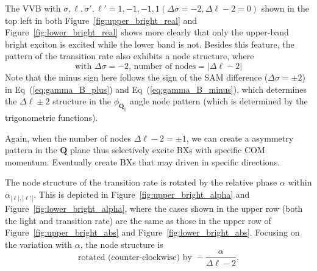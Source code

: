 \noindent
The VVB with $\sigma,\ell,\sigma',\ell'=1, -1, -1, 1(\Delta \sigma=-2, \Delta \ell-2=0)$  shown in the top left in both Figure~\ref{fig:upper_bright_real} and Figure~\ref{fig:lower_bright_real} shows more clearly that only the upper-band bright exciton is excited while the lower band is not. Besides this feature, the pattern of the transition rate also exhibits a node structure, where
\begin{equation*}
\text{with }\Delta \sigma =-2 \text{, number of nodes} = |\Delta \ell-2|
\end{equation*}
Note that the minus sign here follows the sign of the SAM difference ($\Delta \sigma=\pm 2$) in Eq~(\ref{eq:gamma_B_plus}) and Eq~(\ref{eq:gamma_B_minus}), which determines the $\Delta \ell\pm2$ structure in the $\phi_{\boldsymbol{Q}_{\|}}$ angle node pattern (which is determined by the trigonometric functions). 

\noindent
Again, when the number of nodes $\Delta \ell-2=\pm1$, we can create a asymmetry pattern in the $\boldsymbol{Q}$ plane thus selectively excite BXs with specific COM momentum. Eventually create BXs that may driven in specific directions.


The node structure of the transition rate is rotated by the relative phase $\alpha$ within $\alpha_{|\ell|,|\ell'|}$. This is depicted in Figure~\ref{fig:upper_bright_alpha} and Figure~\ref{fig:lower_bright_alpha}, where the cases shown in the upper row (both the light and transition rate) are the same as those in the upper row of Figure~\ref{fig:upper_bright_abs} and Figure~\ref{fig:lower_bright_abs}. Focusing on the variation with $\alpha$, the node structure is
\begin{equation*}
\text{rotated (counter-clockwise) by } -\frac{\alpha}{\Delta \ell - 2}.
\end{equation*}

